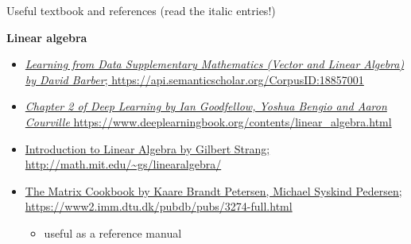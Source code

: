 \documentclass[ignorenonframetext,]{beamer}
\providecommand{\tightlist}{%
  \setlength{\itemsep}{0pt}\setlength{\parskip}{0pt}}
\begin{document}
\begin{frame}{Useful textbook and references (read the italic entries!)}
\protect\hypertarget{useful-textbook-and-references-read-the-italic-entries}{}

\textbf{Linear algebra}

\begin{itemize}
\tightlist
\item
  \href{https://api.semanticscholar.org/CorpusID:18857001}{\emph{Learning
  from Data Supplementary Mathematics (Vector and Linear Algebra) by
  David Barber}; https://api.semanticscholar.org/CorpusID:18857001}
\item
  \href{https://www.deeplearningbook.org/contents/linear_algebra.html}{\emph{Chapter
  2 of Deep Learning by Ian Goodfellow, Yoshua Bengio and Aaron
  Courville}
  https://www.deeplearningbook.org/contents/linear\_algebra.html}
\item
  \href{http://math.mit.edu/~gs/linearalgebra/}{Introduction to Linear
  Algebra by Gilbert Strang;
  http://math.mit.edu/\textasciitilde{}gs/linearalgebra/}
\item
  \href{https://www2.imm.dtu.dk/pubdb/pubs/3274-full.html}{The Matrix
  Cookbook by Kaare Brandt Petersen, Michael Syskind Pedersen;
  https://www2.imm.dtu.dk/pubdb/pubs/3274-full.html}

  \begin{itemize}
  \tightlist
  \item
    useful as a reference manual
  \end{itemize}
\end{itemize}

\end{frame}
\end{document}
